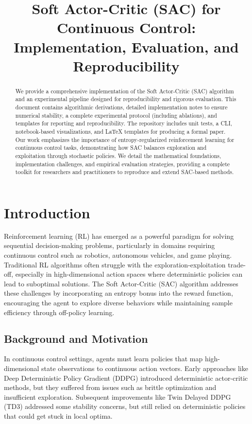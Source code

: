 \documentclass[conference]{IEEEtran}
\title{Soft Actor-Critic (SAC) for Continuous Control: Implementation, Evaluation, and Reproducibility}
\author{\IEEEauthorblockN{Author Name}
\IEEEauthorblockA{Affiliation}}
\begin{document}
\maketitle

\begin{abstract}
We provide a comprehensive implementation of the Soft Actor-Critic (SAC) algorithm and an experimental pipeline designed for reproducibility and rigorous evaluation. This document contains algorithmic derivations, detailed implementation notes to ensure numerical stability, a complete experimental protocol (including ablations), and templates for reporting and reproducibility. The repository includes unit tests, a CLI, notebook-based visualizations, and LaTeX templates for producing a formal paper. Our work emphasizes the importance of entropy-regularized reinforcement learning for continuous control tasks, demonstrating how SAC balances exploration and exploitation through stochastic policies. We detail the mathematical foundations, implementation challenges, and empirical evaluation strategies, providing a complete toolkit for researchers and practitioners to reproduce and extend SAC-based methods.
\end{abstract}

\section{Introduction}
Reinforcement learning (RL) has emerged as a powerful paradigm for solving sequential decision-making problems, particularly in domains requiring continuous control such as robotics, autonomous vehicles, and game playing. Traditional RL algorithms often struggle with the exploration-exploitation trade-off, especially in high-dimensional action spaces where deterministic policies can lead to suboptimal solutions. The Soft Actor-Critic (SAC) algorithm \citep{haarnoja2018soft} addresses these challenges by incorporating an entropy bonus into the reward function, encouraging the agent to explore diverse behaviors while maintaining sample efficiency through off-policy learning.

\subsection{Background and Motivation}
In continuous control settings, agents must learn policies that map high-dimensional state observations to continuous action vectors. Early approaches like Deep Deterministic Policy Gradient (DDPG) \citep{lillicrap2015continuous} introduced deterministic actor-critic methods, but they suffered from issues such as brittle optimization and insufficient exploration. Subsequent improvements like Twin Delayed DDPG (TD3) \citep{fujimoto2018addressing} addressed some stability concerns, but still relied on deterministic policies that could get stuck in local optima.
\end{document}
